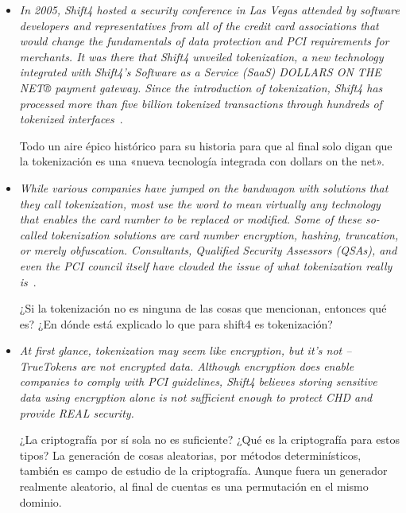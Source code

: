\begin{itemize}

  \item \textit{In 2005, Shift4 hosted a security conference in Las Vegas
    attended by software developers and representatives from all of the credit
    card associations that would change the fundamentals of data protection and
    PCI requirements for merchants. It was there that Shift4 unveiled
    tokenization, a new technology integrated with Shift4's Software as a
    Service (SaaS) DOLLARS ON THE NET® payment gateway. Since the introduction
    of tokenization, Shift4 has processed more than five billion tokenized
    transactions through hundreds of tokenized interfaces}~\cite{shift4_uno}.

    Todo un aire épico histórico para su historia para que al final solo digan
    que la tokenización es una «nueva tecnología integrada con dollars on the
    net».

  \item \textit{While various companies have jumped on the bandwagon with
    solutions that they call tokenization, most use the word to mean virtually
    any technology that enables the card number to be replaced or modified. Some
    of these so-called tokenization solutions are card number encryption,
    hashing, truncation, or merely obfuscation. Consultants, Qualified Security
    Assessors (QSAs), and even the PCI council itself have clouded the issue of
    what tokenization really is}~\cite{shift4_uno}.

    ¿Si la tokenización no es ninguna de las cosas que mencionan, entonces qué
    es? ¿En dónde está explicado lo que para shift4 es tokenización?

  \item \textit{At first glance, tokenization may seem like encryption, but it's
    not – TrueTokens are not encrypted data. Although encryption does enable
    companies to comply with PCI guidelines, Shift4 believes storing sensitive
    data using encryption alone is not sufficient enough to protect CHD and
    provide REAL security.}

    ¿La criptografía por sí sola no es suficiente? ¿Qué es la criptografía para
    estos tipos? La generación de cosas aleatorias, por métodos determinísticos,
    también es campo de estudio de la criptografía. Aunque fuera un generador
    realmente aleatorio, al final de cuentas es una permutación en el mismo
    dominio.

\end{itemize}



